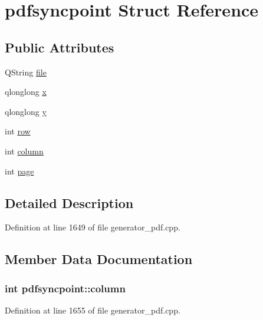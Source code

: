 \hypertarget{structpdfsyncpoint}{\section{pdfsyncpoint Struct Reference}
\label{structpdfsyncpoint}
}
\subsection*{Public Attributes}
\begin{DoxyCompactItemize}
\item 
Q\+String \hyperlink{structpdfsyncpoint_adcfa7e4135135b0c4a3e7e5a8807ceeb}{file}
\item 
qlonglong \hyperlink{structpdfsyncpoint_a42fa1214ad08ede751ccc0343b4b2928}{x}
\item 
qlonglong \hyperlink{structpdfsyncpoint_ab480c3b2c0e9f41c3d2b90f615c35c5b}{y}
\item 
int \hyperlink{structpdfsyncpoint_a85d6f0001387e892225fab56ab806ac1}{row}
\item 
int \hyperlink{structpdfsyncpoint_a5c78620d8535c5ffd47738c654cd97cc}{column}
\item 
int \hyperlink{structpdfsyncpoint_a38aa2f14b976bd9df900047205693e73}{page}
\end{DoxyCompactItemize}


\subsection{Detailed Description}


Definition at line 1649 of file generator\+\_\+pdf.\+cpp.



\subsection{Member Data Documentation}
\hypertarget{structpdfsyncpoint_a5c78620d8535c5ffd47738c654cd97cc}{
\subsubsection[{column}]{\setlength{\rightskip}{0pt plus 5cm}int pdfsyncpoint\+::column}}\label{structpdfsyncpoint_a5c78620d8535c5ffd47738c654cd97cc}


Definition at line 1655 of file generator\+\_\+pdf.\+cpp.

